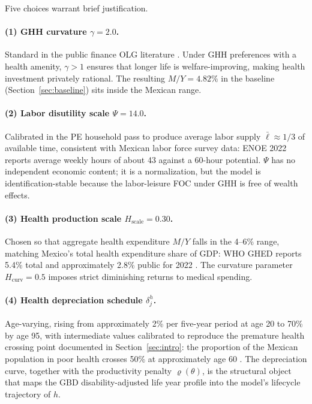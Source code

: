 \documentclass[12pt,a4paper]{article}
\begin{document}
Five choices warrant brief justification.

\paragraph{(1) GHH curvature $\gamma = 2.0$.}
Standard in the public finance OLG literature
\citep{AuerbachKotlikoff1987, DeNardi2010}. Under GHH preferences with
a health amenity, $\gamma > 1$ ensures that longer life is
welfare-improving, making health investment privately rational. The
resulting $M/Y = 4.82\%$ in the baseline (Section~\ref{sec:baseline})
sits inside the Mexican range.

\paragraph{(2) Labor disutility scale $\Psi = 14.0$.}
Calibrated in the PE household pass to produce average labor supply
$\bar{\ell} \approx 1/3$ of available time, consistent with Mexican
labor force survey data: ENOE 2022 reports average weekly hours of
about 43 against a 60-hour potential. $\Psi$ has no independent
economic content; it is a normalization, but the model is
identification-stable because the labor-leisure FOC under GHH is free
of wealth effects.

\paragraph{(3) Health production scale $H_{\text{scale}} = 0.30$.}
Chosen so that aggregate health expenditure $M/Y$ falls in the 4--6\%
range, matching Mexico's total health expenditure share of GDP: WHO
GHED reports 5.4\% total and approximately 2.8\% public for
2022 \citep{WHOGHED2024}. The curvature parameter $H_{\text{curv}} = 0.5$
imposes strict diminishing returns to medical spending.

\paragraph{(4) Health depreciation schedule $\delta^{h}_{j}$.}
Age-varying, rising from approximately 2\% per five-year period at age 20
to 70\% by age 95, with intermediate values calibrated to reproduce
the premature health crossing point documented in
Section~\ref{sec:intro}: the proportion of the Mexican population in
poor health crosses 50\% at approximately age 60 \citep{GBD2021}.
The depreciation curve, together with the productivity penalty
$\varrho(\theta)$, is the structural object that maps the GBD
disability-adjusted life year profile into the model's lifecycle
trajectory of $h$.
\end{document}
